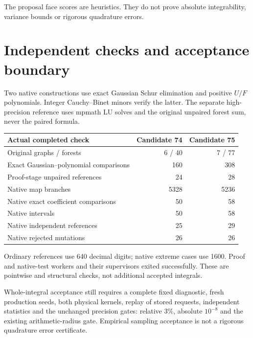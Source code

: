 \documentclass[11pt]{article}
\begin{document}
The proposal face scores are heuristics. They do not prove absolute
integrability, variance bounds or rigorous quadrature errors.

\section{Independent checks and acceptance boundary}
Two native constructions use exact Gaussian Schur elimination and positive
$U/F$ polynomials. Integer Cauchy--Binet minors verify the latter. The separate
high-precision reference uses mpmath LU solves and the original unpaired
forest sum, never the paired formula.

\begin{center}
\begin{tabular}{lrr}
\toprule
Actual completed check & Candidate 74 & Candidate 75\\
\midrule
Original graphs / forests & 6 / 40 & 7 / 77\\
Exact Gaussian--polynomial comparisons & 160 & 308\\
Proof-stage unpaired references & 24 & 28\\
Native map branches & 5328 & 5236\\
Native exact coefficient comparisons & 50 & 58\\
Native intervals & 50 & 58\\
Native independent references & 25 & 29\\
Native rejected mutations & 26 & 26\\
\bottomrule
\end{tabular}
\end{center}
Ordinary references use 640 decimal digits; native extreme cases use 1600.
Proof and native-test workers and their supervisors exited successfully.
These are pointwise and structural checks, not additional accepted integrals.

Whole-integral acceptance still requires a complete fixed diagnostic,
fresh production seeds, both physical kernels, replay of stored requests,
independent statistics and the unchanged precision gates:
relative $3\%$, absolute $10^{-8}$ and the existing arithmetic-radius gate.
Empirical sampling acceptance is not a rigorous quadrature error certificate.
\end{document}
